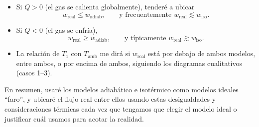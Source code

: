 \documentclass[11pt,a4paper]{article}
\begin{document}
\begin{itemize}
  \item Si \(Q>0\) (el gas se calienta globalmente), tenderé a ubicar
        \[
        w_\text{real} \le w_\text{adiab},
        \qquad
        \text{y frecuentemente } w_\text{real} \lesssim w_\text{iso}.
        \]
  \item Si \(Q<0\) (el gas se enfría),
        \[
        w_\text{real} \ge w_\text{adiab},
        \qquad
        \text{y típicamente } w_\text{real} \gtrsim w_\text{iso}.
        \]
  \item La relación de \(T_1\) con \(T_\text{amb}\) me dirá si
        \(w_\text{real}\) está por debajo de ambos modelos, entre ambos, o por
        encima de ambos, siguiendo los diagramas cualitativos (casos 1--3).
\end{itemize}

En resumen, usaré los modelos adiabático e isotérmico como modelos ideales
``faro'', y ubicaré el flujo real entre ellos usando estas desigualdades y
consideraciones térmicas cada vez que tengamos que elegir el modelo ideal o
justificar cuál usamos para acotar la realidad.
\end{document}
